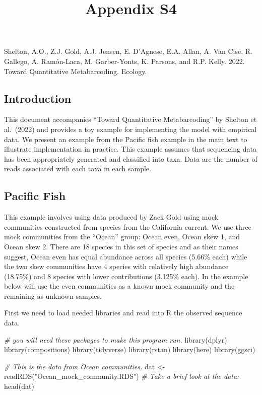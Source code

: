 \documentclass[
]{article}
\title{Appendix S4}
\date{}
\newenvironment{Shaded}{\begin{snugshade}}{\end{snugshade}}
\newcommand{\CommentTok}[1]{\textcolor[rgb]{0.56,0.35,0.01}{\textit{#1}}}
\newcommand{\FunctionTok}[1]{\textcolor[rgb]{0.00,0.00,0.00}{#1}}
\newcommand{\NormalTok}[1]{#1}
\newcommand{\OtherTok}[1]{\textcolor[rgb]{0.56,0.35,0.01}{#1}}
\newcommand{\StringTok}[1]{\textcolor[rgb]{0.31,0.60,0.02}{#1}}
\begin{document}
\maketitle
Shelton, A.O., Z.J. Gold, A.J. Jensen, E. D'Agnese,  E.A.
Allan, A. Van Cise, R. Gallego, A. Ramón-Laca, M. Garber-Yonts, K.
Parsons, and R.P. Kelly. 2022. Toward Quantitative Metabarcoding.  Ecology.


\subsection{Introduction}

This document accompanies ``Toward Quantitative Metabarcoding'' by
Shelton et al.~(2022) and provides a toy example for implementing the
model with empirical data. We present an example from the Pacific fish
example in the main text to illustrate implementation in practice. This
example assumes that sequencing data has been appropriately generated
and classified into taxa. Data are the number of reads associated with
each taxa in each sample.

\hypertarget{pacific-fish}{%
\subsection{Pacific Fish}\label{pacific-fish}}

This example involves using data produced by Zack Gold using mock
communities constructed from species from the California current. We use
three mock communities from the ``Ocean'' group: Ocean even, Ocean skew
1, and Ocean skew 2. There are 18 species in this set of species and as
their names suggest, Ocean even has equal abundance across all species
(5.66\% each) while the two skew communities have 4 species with
relatively high abundance (18.75\%) and 8 species with lower
contributions (3.125\% each). In the example below will use the even
communities as a known mock community and the remaining as unknown
samples.

First we need to load needed libraries and read into R the observed
sequence data.

\begin{Shaded}
\begin{Highlighting}[]
\CommentTok{\# you will need these packages to make this program run.}
\FunctionTok{library}\NormalTok{(dplyr)}
\FunctionTok{library}\NormalTok{(compositions)}
\FunctionTok{library}\NormalTok{(tidyverse)}
\FunctionTok{library}\NormalTok{(rstan)}
\FunctionTok{library}\NormalTok{(here)}
\FunctionTok{library}\NormalTok{(ggsci)}

\CommentTok{\# This is the data from Ocean communities.}
\NormalTok{dat }\OtherTok{\textless{}{-}} \FunctionTok{readRDS}\NormalTok{(}\StringTok{"Ocean\_mock\_community.RDS"}\NormalTok{)}
\CommentTok{\# Take a brief look at the data:}
\FunctionTok{head}\NormalTok{(dat)}
\end{Highlighting}
\end{Shaded}
\end{document}
